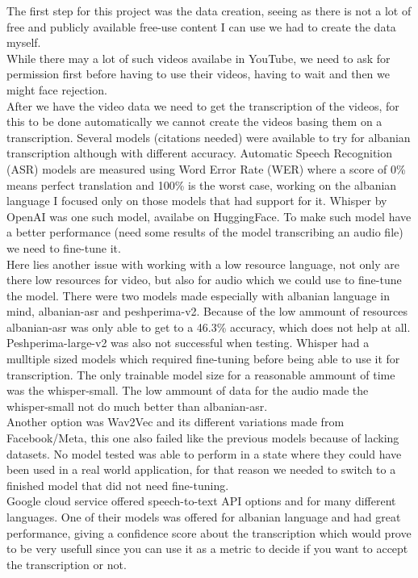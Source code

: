 \documentclass[12pt]{article}
\begin{document}
The first step for this project was the data creation, seeing as there is not a lot of free and publicly available free-use content I can use we had to create the data myself.\\
While there may a lot of such videos availabe in YouTube, we need to ask for permission first before having to use their videos, having to wait and then we might face rejection.\\
After we have the video data we need to get the transcription of the videos, for this to be done automatically we cannot create the videos basing them on a transcription. Several models (citations needed) were available to try for albanian transcription although with different accuracy. Automatic Speech Recognition (ASR) models are measured using Word Error Rate (WER) where a score of 0\% means perfect translation and 100\% is the worst case, working on the albanian language I focused only on those models that had support for it. Whisper by OpenAI was one such model, availabe on HuggingFace. To make such model have a better performance (need some results of the model transcribing an audio file) we need to fine-tune it. \\
Here lies another issue with working with a low resource language, not only are there low resources for video, but also for audio which we could use to fine-tune the model. There were two models made especially with albanian language in mind, albanian-asr and peshperima-v2. Because of the low ammount of resources albanian-asr was only able to get to a 46.3\% accuracy, which does not help at all. Peshperima-large-v2 was also not successful when testing. Whisper had a mulltiple sized models which required fine-tuning before being able to use it for transcription. The only trainable model size for a reasonable ammount of time was the whisper-small. The low ammount of data for the audio made the whisper-small not do much better than albanian-asr. \\
Another option was Wav2Vec and its different variations made from Facebook/Meta, this one also failed like the previous models because of lacking datasets. No model tested was able to perform in a state where they could have been used in a real world application, for that reason we needed to switch to a finished model that did not need fine-tuning.\\
Google cloud service offered speech-to-text API options and for many different languages. One of their models was offered for albanian language and had great performance, giving a confidence score about the transcription which would prove to be very usefull since you can use it as a metric to decide if you want to accept the transcription or not. \\
\end{document}
